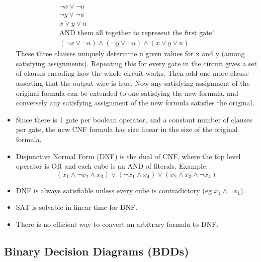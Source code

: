 \documentclass{article}
\begin{document}
\begin{itemize}
\begin{align*}
\neg x \lor \neg u \\
\neg y \lor \neg u \\
x \lor y \lor u\\
\text{AND them all together to represent the first gate!} \\
(\neg x \lor \neg u) \land (\neg y \lor \neg u) \land (x \lor y \lor u)
\end{align*}
These three clauses uniquely determine u given values for x and y (among satisfying assignments). Repeating this for every gate in the circuit gives a set of clauses encoding how the whole circuit works. Then add one more clause asserting that the output wire is true. Now any satisfying assignment of the original formula can be extended to one satisfying the new formula, and conversely any satisfying assignment of the new formula satisfies the original.
\item Since there is 1 gate per boolean operator, and a constant number of clauses per gate, the new CNF formula has size linear in the size of the original formula.
\item Disjunctive Normal Form (DNF) is the dual of CNF, where the top level operator is OR and each cube is an AND of literals. Example: \[(x_1 \land \neg x_2 \land x_3) \lor (\neg x_1 \land x_4) \lor (x_2 \land x_3 \land \neg x_4)\]
\item DNF is always satisfiable unless every cube is contradictory (eg $x_1 \land \neg x_1$).
\item SAT is solvable in linear time for DNF.
\item There is no efficient way to convert an arbitrary formula to DNF.
\end{itemize}

\subsection{Binary Decision Diagrams (BDDs)}
\end{document}
